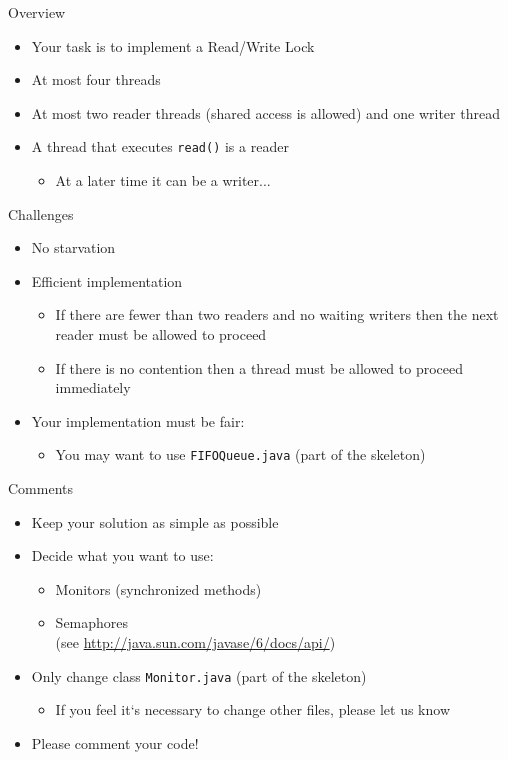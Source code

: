 \begin{frame}{Overview}
  \begin{itemize}
  \item Your task is to implement a Read/Write Lock
  \item At most four threads
  \item At most two reader threads (shared access is allowed) and one
    writer thread
  \item A thread that executes \lstinline!read()! is a reader
    \begin{itemize}
    \item At a later time it can be a writer...
    \end{itemize}
  \end{itemize}
\end{frame}

\begin{frame}{Challenges}
  \begin{itemize}
  \item No starvation
  \item Efficient implementation
    \begin{itemize}
    \item If there are fewer than two readers and no waiting writers
      then the next reader must be allowed to proceed
    \item If there is no contention then a thread must be allowed to
      proceed immediately
    \end{itemize}
  \item Your implementation must be fair:
    \begin{itemize}
    \item You may want to use \lstinline!FIFOQueue.java! (part of the
      skeleton)
    \end{itemize}
  \end{itemize}
\end{frame}

\begin{frame}{Comments}
  \begin{itemize}
  \item Keep your solution as simple as possible
  \item Decide what you want to use:
    \begin{itemize}
    \item Monitors (synchronized methods)
    \item Semaphores \\
      (see \url{http://java.sun.com/javase/6/docs/api/})
    \end{itemize}
  \item Only change class \lstinline!Monitor.java! (part of the
    skeleton)
    \begin{itemize}
    \item If you feel it‘s necessary to change other files, please let
      us know
    \end{itemize}
  \item Please comment your code!
  \end{itemize}
\end{frame}

